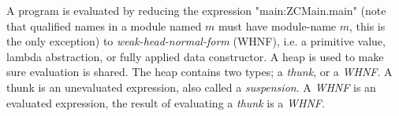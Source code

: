 A program is evaluated by reducing the expression "main:ZCMain.main" (note that
qualified names in a module named $m$ must have module-name $m$, this is the only exception) 
to \emph{weak-head-normal-form} (WHNF), i.e. a primitive value, lambda abstraction, or 
fully applied data constructor. A heap is used to make
sure evaluation is shared. The heap contains two types; a \emph{thunk}, 
or a \emph{WHNF}. A thunk is an unevaluated
expression, also called a \emph{suspension}. A \emph{WHNF} is an evaluated expression, 
the result of evaluating a \emph{thunk} is a \emph{WHNF}. \cite{tolmach2010ghc}

